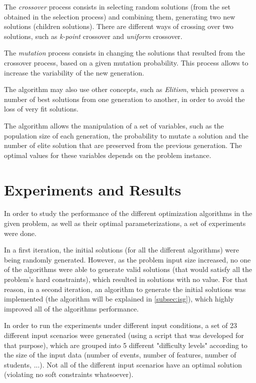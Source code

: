 \documentclass[conference]{IEEEtran}
\begin{document}
The \textit{crossover} process consists in selecting random solutions (from the set obtained in the selection process) and combining them, generating two new solutions (children solutions). There are different ways of crossing over two solutions, such as \textit{k-point} crossover and \textit{uniform} crossover.

The \textit{mutation} process consists in changing the solutions that resulted from the crossover process, based on a given mutation probability. This process allows to increase the variability of the new generation.

The algorithm may also use other concepts, such as \textit{Elitism}, which preserves a number of best solutions from one generation to another, in order to avoid the loss of very fit solutions.

The algorithm allows the manipulation of a set of variables, such as the population size of each generation, the probability to mutate a solution and the number of elite solution that are preserved from the previous generation. The optimal values for these variables depends on the problem instance.

\section{Experiments and Results} \label{sec:ear}

In order to study the performance of the different optimization algorithms in the given problem, as well as their optimal parameterizations, a set of experiments were done.

In a first iteration, the initial solutions (for all the different algorithms) were being randomly generated. However, as the problem input size increased, no one of the algorithms were able to generate valid solutions (that would satisfy all the problem's hard constraints), which resulted in solutions with no value. For that reason, in a second iteration, an algorithm to generate the initial solutions was implemented (the algorithm will be explained in \autoref{subsec:isg}), which highly improved all of the algorithms performance.

In order to run the experiments under different input conditions, a set of 23 different input scenarios were generated (using a script that was developed for that purpose), which are grouped into 5 different "difficulty levels" according to the size of the input data (number of events, number of features, number of students, ...). Not all of the different input scenarios have an optimal solution (violating no soft constraints whatsoever).
\end{document}
